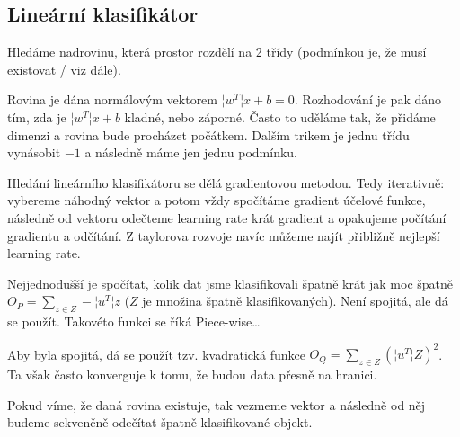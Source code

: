 \documentclass[12pt]{article}					%
\begin{document}
    \subsection{Lineární klasifikátor}
        \begin{definice}
            Hledáme nadrovinu, která prostor rozdělí na 2 třídy (podmínkou je, že musí existovat / viz dále).

            Rovina je dána normálovým vektorem $¦w^T¦x + b = 0$. Rozhodování je pak dáno tím, zda je $¦w^T¦x + b$ kladné, nebo záporné. Často to uděláme tak, že přidáme dimenzi a rovina bude procházet počátkem. Dalším trikem je jednu třídu vynásobit $-1$ a následně máme jen jednu podmínku.

            Hledání lineárního klasifikátoru se dělá gradientovou metodou. Tedy iterativně: vybereme náhodný vektor a potom vždy spočítáme gradient účelové funkce, následně od vektoru odečteme learning rate krát gradient a opakujeme počítání gradientu a odčítání. Z taylorova rozvoje navíc můžeme najít přibližně nejlepší learning rate.
        \end{definice}

        \begin{definice}
            Nejjednodušší je spočítat, kolik dat jsme klasifikovali špatně krát jak moc špatně $O_P = \sum_{z \in Z} - ¦u^T¦z$ ($Z$ je množina špatně klasifikovaných). Není spojitá, ale dá se použít. Takovéto funkci se říká Piece-wise…

            Aby byla spojitá, dá se použít tzv. kvadratická funkce $O_Q = \sum_{z \in Z}(¦u^T¦Z)^2$. Ta však často konverguje k tomu, že budou data přesně na hranici.
        \end{definice}

        \begin{definice}
            Pokud víme, že daná rovina existuje, tak vezmeme vektor a následně od něj budeme sekvenčně odečítat špatně klasifikované objekt.
        \end{definice}
\end{document}
